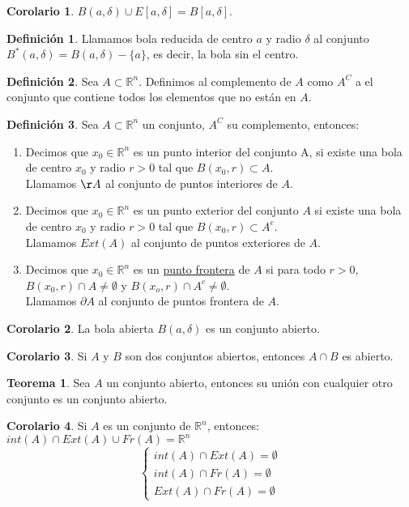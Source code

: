 \documentclass[10pt]{article}
\theoremstyle{definition}
\newtheorem{definition}{Definición}[section]
\newtheorem{theorem}{Teorema}[section]
\newtheorem{corollary}{Corolario}[theorem]
\begin{document}
\begin{corollary}
	$B(a,\delta) \cup E[a,\delta]=B[a,\delta]$.
\end{corollary}
\begin{definition}
    Llamamos bola reducida de centro $a$ y radio $\delta$ al conjunto $B^*(a,\delta)=B(a,\delta)-\{a\}$, es decir, la bola sin el centro.
\end{definition}
\begin{definition}
    Sea $A\subset\mathbb{R}^n$. Definimos al complemento de $A$ como $A^C$ a el conjunto que contiene todos los elementos que no están en $A$.
\end{definition}
\newpage\begin{definition}
    Sea $A\subset\mathbb{R}^n$ un conjunto, $A^C$ su complemento, entonces:
    \begin{enumerate}
        \item Decimos que $x_0\in\mathbb{R}^n$ es un punto interior del conjunto A, si existe una bola de centro $x_0$ y radio $r>0$ tal que $B(x_0,r)\subset A$.\\
            Llamamos ${\r A}$ al conjunto de puntos interiores de $A$.
        \item Decimos que $x_0\in\mathbb{R}^n$ es un punto exterior del conjunto $A$ si existe una bola de centro $x_0$ y radio $r>0$ tal que $B(x_0,r)\subset A^c$.
            \\Llamamos $Ext(A)$ al conjunto de puntos exteriores de $A$.
        \item Decimos que $x_0 \in\mathbb{R}^n$ es un \underline{punto frontera} de $A$ si para todo $r>0$, $B(x_0,r)\cap A\ne \emptyset$ y $B(x_o,r)\cap A^c \ne \emptyset$.
            \\Llamamos $\partial A$ al conjunto de puntos frontera de $A$.
    \end{enumerate}
\end{definition}
\begin{corollary}
    La bola abierta $B(a,\delta)$ es un conjunto abierto.
\end{corollary}
\begin{corollary}
    Si $A$ y $B$ son dos conjuntos abiertos, entonces $A\cap B$ es abierto.
\end{corollary}
\begin{theorem}
    Sea $A$ un conjunto abierto, entonces su unión con cualquier otro conjunto es un conjunto abierto.
\end{theorem}
\begin{corollary}
    Si $A$ es un conjunto de $\mathbb{R}^n$, entonces:
    \\$int(A)\cap Ext(A)\cup Fr(A)=\mathbb{R}^n$
    \\$$ \begin{cases}
        int(A)\cap Ext(A)=\emptyset
        \\ int(A)\cap Fr(A)=\emptyset
        \\ Ext(A)\cap Fr(A)=\emptyset
    \end{cases}$$
\end{corollary}
\end{document}
